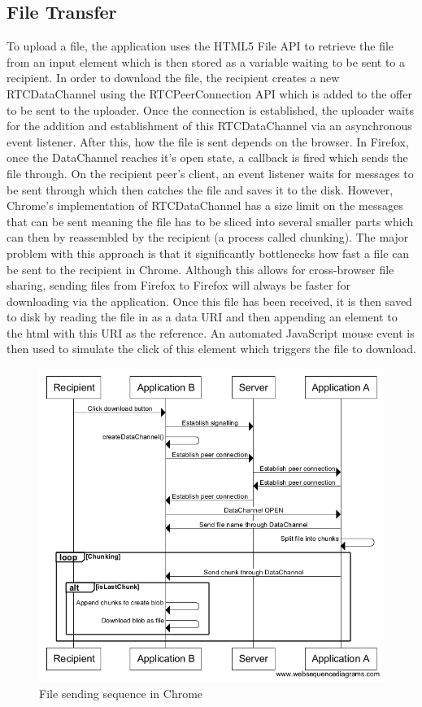 \documentclass[]{report}
\begin{document}
			\subsection{File Transfer}
			To upload a file, the application uses the HTML5 File API  to retrieve the file from an input element which is then stored as a variable waiting to be sent to a recipient. In order to download the file, the recipient creates a new RTCDataChannel using the RTCPeerConnection API which is added to the offer to be sent to the uploader. Once the connection is established, the uploader waits for the addition and establishment of this RTCDataChannel via an asynchronous event listener. After this, how the file is sent depends on the browser. In Firefox, once the DataChannel reaches it's open state, a callback is fired which sends the file through. On the recipient peer's client, an event listener waits for messages to be sent through which then catches the file and saves it to the disk. However, Chrome's implementation of RTCDataChannel has a size limit on the messages that can be sent meaning the file has to be sliced into several smaller parts which can then by reassembled by the recipient (a process called chunking). The major problem with this approach is that it significantly bottlenecks how fast a file can be sent to the recipient in Chrome. Although this allows for cross-browser file sharing, sending files from Firefox to Firefox will always be faster for downloading via the application. Once this file has been received, it is then saved to disk by reading the file in as a data URI and then appending an element to the html with this URI as the reference. An automated JavaScript mouse event is then used to simulate the click of this element which triggers the file to download. 
			
			\begin{figure}[H]
				\caption{File sending sequence in Chrome}
				\centering
				\includegraphics[scale=0.5]{file-sending-sequence-chrome.png}
			\end{figure}
			
\end{document}
